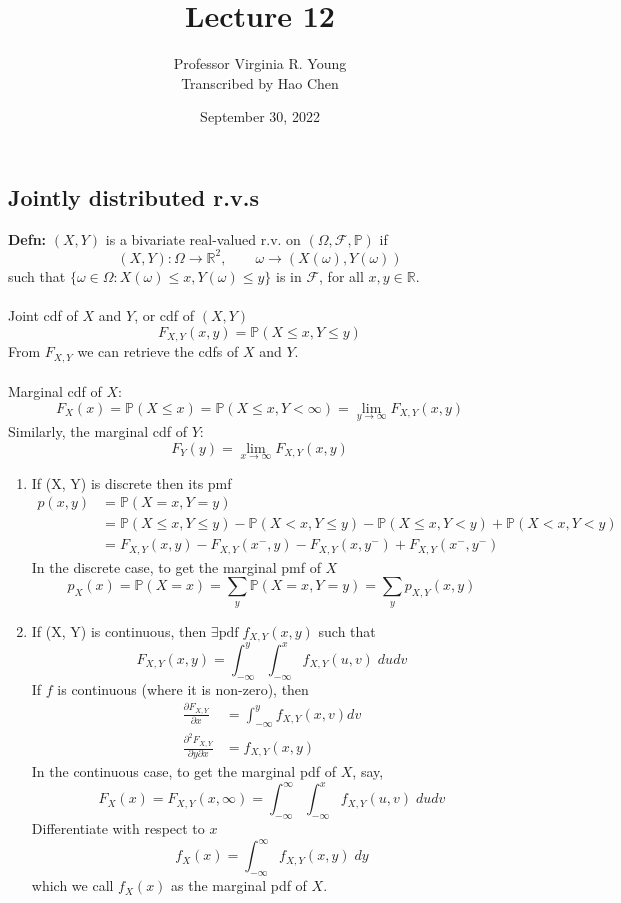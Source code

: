 \documentclass[a4paper]{article}
\title{Lecture 12}
\author{Professor Virginia R. Young\\ \small{Transcribed by Hao Chen}}
\date{September 30, 2022}
\newcommand{\n}{\hfill\break}
\newcommand{\defn}[1]{\par\noindent\settowidth{\hangindent}{\textbf{Defn: }}\textbf{Defn: }#1\n}
\newcommand{\reals}{\mathbb{R}}
\newcommand{\R}{\reals}
\newcommand{\F}{\mathcal F}
\newcommand{\Prob}{\mathbb{P}}
\renewcommand{\P}{\Prob}
\begin{document}
\maketitle

\subsection*{Jointly distributed r.v.s}

\defn{
    $(X, Y)$ is a bivariate real-valued r.v. on $(\Omega, \F, \P)$ if
    \[(X, Y):\Omega\rightarrow\R^2, \qquad \omega\rightarrow(X(\omega), Y(\omega))\]
    such that $\{\omega\in\Omega:X(\omega)\leq x, Y(\omega)\leq y\}$ is in $\F$, for all $x, y\in\R$. 
    \\\\
    Joint cdf of $X$ and $Y$, or cdf of $(X, Y)$
    \[F_{X,Y}(x, y)=\P(X\leq x, Y\leq y)\]
    From $F_{X,Y}$ we can retrieve the cdfs of $X$ and $Y$.
    \\\\
    Marginal cdf of $X$:
    \[F_X(x)=\P(X\leq x)=\P(X\leq x, Y<\infty)=\lim_{y\rightarrow\infty}F_{X,Y}(x, y)\]
    Similarly, the marginal cdf of $Y$:
    \[F_Y(y)=\lim_{x\rightarrow\infty}F_{X,Y}(x, y)\]
    \begin{enumerate}
        \item 
            If (X, Y) is discrete then its pmf
            \begin{align*}
                p(x, y)&=\P(X=x, Y=y) \\
                &=\P(X\leq x, Y\leq y)-\P(X<x, Y\leq y)-\P(X\leq x, Y<y)+\P(X<x, Y<y) \\
                &=F_{X,Y}(x, y) - F_{X,Y}(x^-, y) - F_{X,Y}(x, y^-) + F_{X,Y}(x^-, y^-)
            \end{align*}
            In the discrete case, to get the marginal pmf of $X$
            \[p_X(x)=\P(X=x)=\sum_y\P(X=x, Y=y)=\sum_y p_{X,Y}(x, y)\]
        \item 
            If (X, Y) is continuous, then $\exists\text{pdf}\;f_{X,Y}(x, y)$ such that
            \[F_{X,Y}(x, y)=\int^y_{-\infty} \int^x_{-\infty}f_{X,Y}(u, v)\;dudv\]
            If $f$ is continuous (where it is non-zero), then
            \begin{align*}
                \frac{\partial F_{X,Y}}{\partial x}&=\int^y_{-\infty}f_{X,Y}(x, v)dv \\
                \frac{\partial^2F_{X,Y}}{\partial y\partial x}&=f_{X,Y}(x, y)
            \end{align*}
            In the continuous case, to get the marginal pdf of $X$, say,
            \[F_X(x)=F_{X,Y}(x, \infty)=\int^\infty_{-\infty}\int^x_{-\infty}f_{X,Y}(u, v)\;dudv\]
            Differentiate with respect to $x$
            \[f_X(x)=\int^\infty_{-\infty}f_{X,Y}(x,y)\;dy\]
            which we call $f_X(x)$ as the marginal pdf of $X$.
    \end{enumerate}
}
\end{document}
